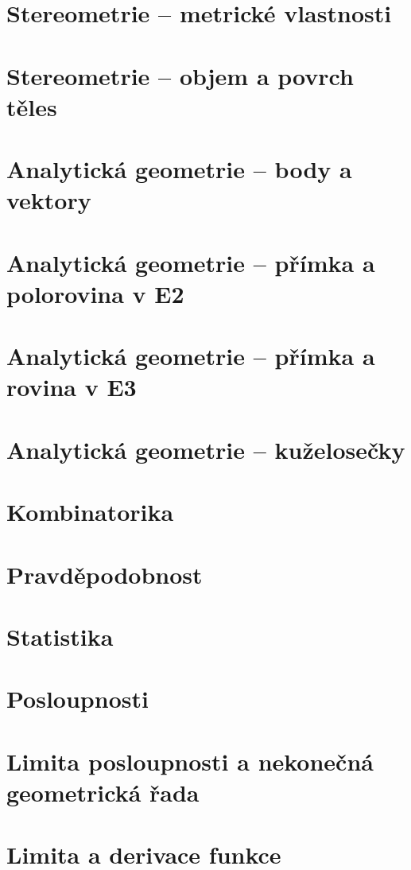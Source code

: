 \documentclass[12pt, a4paper]{article}
\begin{document}
\section{Stereometrie – metrické vlastnosti}
\section{Stereometrie – objem a povrch těles}
\section{Analytická geometrie – body a vektory}
\section{Analytická geometrie – přímka a polorovina v E2}
\section{Analytická geometrie – přímka a rovina v E3}
\section{Analytická geometrie – kuželosečky}
\section{Kombinatorika}
\section{Pravděpodobnost}
\section{Statistika}
\section{Posloupnosti}
\section{Limita posloupnosti a nekonečná geometrická řada}
\section{Limita a derivace funkce}
\end{document}
